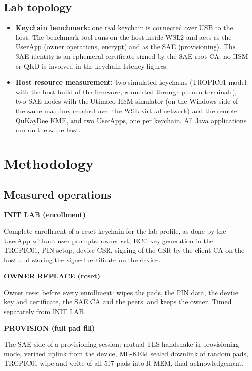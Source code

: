 \documentclass[11pt,a4paper]{report}
\newcommand{\benchcard}[2]{%
  \begin{tcolorbox}[
    colback=cardbg, colframe=cardborder, boxrule=0.5pt, arc=2.5pt,
    left=8pt, right=8pt, top=6pt, bottom=6pt,
    before skip=4pt, after skip=4pt, breakable]
  {\small\bfseries #1}\par
  \vspace{3pt}
  {\small\color{black!85} #2}
  \end{tcolorbox}%
}
\begin{document}
\section{Lab topology}
\label{sec:topology}

\begin{itemize}
\item \textbf{Keychain benchmark:} one real keychain is connected over USB to the host. The benchmark tool runs on the host inside WSL2 and acts as the UserApp (owner operations, encrypt) and as the SAE (provisioning). The SAE identity is an ephemeral certificate signed by the SAE root CA; no HSM or QKD is involved in the keychain latency figures.
\item \textbf{Host resource measurement:} two simulated keychains (TROPIC01 model with the host build of the firmware, connected through pseudo-terminals), two SAE nodes with the Utimaco HSM simulator (on the Windows side of the same machine, reached over the WSL virtual network) and the remote QuKayDee KME, and two UserApps, one per keychain. All Java applications run on the same host.
\end{itemize}

\chapter{Methodology}

\section{Measured operations}

\benchcard{INIT LAB (enrollment)}{Complete enrollment of a reset keychain for the lab profile, as done by the UserApp without user prompts: owner set, ECC key generation in the TROPIC01, PIN setup, device CSR, signing of the CSR by the client CA on the host and storing the signed certificate on the device.}

\benchcard{OWNER REPLACE (reset)}{Owner reset before every enrollment: wipes the pads, the PIN data, the device key and certificate, the SAE CA and the peers, and keeps the owner. Timed separately from INIT LAB.}

\benchcard{PROVISION (full pad fill)}{The SAE side of a provisioning session: mutual TLS handshake in provisioning mode, verified uplink from the device, ML-KEM sealed downlink of random pads, TROPIC01 wipe and write of all 507 pads into R-MEM, final acknowledgement.}
\end{document}
